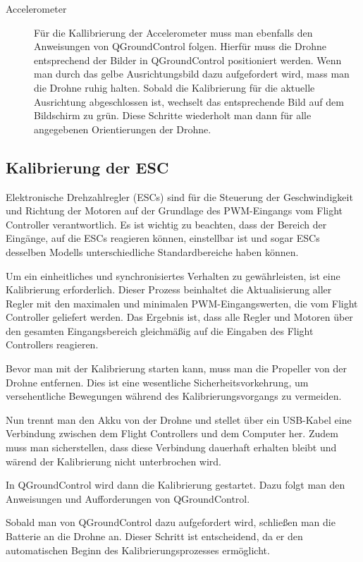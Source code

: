 \begin{description}
    \item[Accelerometer] Für die Kallibrierung der Accelerometer muss man ebenfalls den Anweisungen von QGroundControl folgen. Hierfür muss die Drohne entsprechend der Bilder in QGroundControl positioniert werden. Wenn man durch das gelbe Ausrichtungsbild dazu aufgefordert wird, mass man die Drohne ruhig halten. Sobald die Kalibrierung für die aktuelle Ausrichtung abgeschlossen ist, wechselt das entsprechende Bild auf dem Bildschirm zu grün. Diese Schritte wiederholt man dann für alle angegebenen Orientierungen der Drohne.
\end{description}



\subsection{Kalibrierung der ESC}
Elektronische Drehzahlregler (ESCs) sind für die Steuerung der Geschwindigkeit und Richtung der Motoren auf der Grundlage des PWM-Eingangs vom Flight Controller verantwortlich. Es ist wichtig zu beachten, dass der Bereich der Eingänge, auf die ESCs reagieren können, einstellbar ist und sogar ESCs desselben Modells unterschiedliche Standardbereiche haben können.

Um ein einheitliches und synchronisiertes Verhalten zu gewährleisten, ist eine Kalibrierung erforderlich. Dieser Prozess beinhaltet die Aktualisierung aller Regler mit den maximalen und minimalen PWM-Eingangswerten, die vom Flight Controller geliefert werden. Das Ergebnis ist, dass alle Regler und Motoren über den gesamten Eingangsbereich gleichmäßig auf die Eingaben des Flight Controllers reagieren.

Bevor man mit der Kalibrierung starten kann, muss man die Propeller von der Drohne entfernen. Dies ist eine wesentliche Sicherheitsvorkehrung, um versehentliche Bewegungen während des Kalibrierungsvorgangs zu vermeiden.

Nun trennt man den Akku von der Drohne und stellet über ein USB-Kabel eine Verbindung zwischen dem Flight Controllers und dem Computer her. Zudem muss man sicherstellen, dass diese Verbindung dauerhaft erhalten bleibt und wärend der Kalibrierung nicht unterbrochen wird.

In QGroundControl wird dann die Kalibrierung gestartet. Dazu folgt man den Anweisungen und Aufforderungen von QGroundControl.

Sobald man von QGroundControl dazu aufgefordert wird, schließen man die Batterie an die Drohne an. Dieser Schritt ist entscheidend, da er den automatischen Beginn des Kalibrierungsprozesses ermöglicht.

